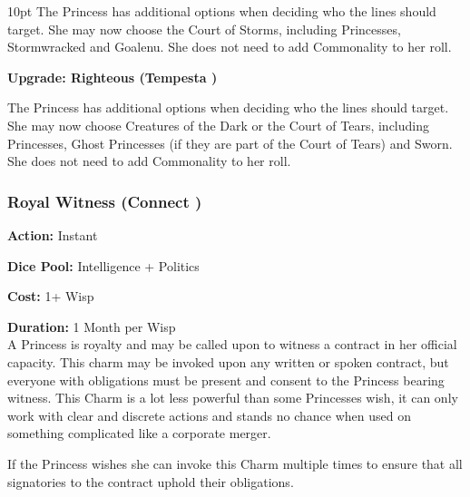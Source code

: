 \begin{myindentpar}{10pt}
The Princess has additional options when deciding who the lines should target. She may now choose the Court of Storms, including Princesses, Stormwracked and Goalenu. She does not need to add Commonality to her roll. 

\textbf{Upgrade: Righteous (Tempesta \textbullet)}

The Princess has additional options when deciding who the lines should target. She may now choose Creatures of the Dark or the Court of Tears, including Princesses, Ghost Princesses (if they are part of the Court of Tears) and Sworn. She does not need to add Commonality to her roll. 

\end{myindentpar}

\subsubsection*{Royal Witness (Connect \textbullet)}

\noindent \textbf{Action:} Instant

\noindent \textbf{Dice Pool:} Intelligence + Politics

\noindent \textbf{Cost:} 1+ Wisp

\noindent \textbf{Duration:} 1 Month per Wisp \\

A Princess is royalty and may be called upon to witness a contract in her official capacity. This charm may be invoked upon any written or spoken contract, but everyone with obligations must be present and consent to the Princess bearing witness. This Charm is a lot less powerful than some Princesses wish, it can only work with clear and discrete actions and stands no chance when used on something complicated like a corporate merger.

If the Princess wishes she can invoke this Charm multiple times to ensure that all signatories to the contract uphold their obligations. 

